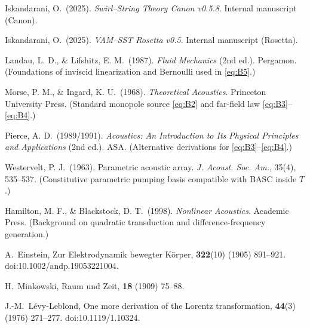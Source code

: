\documentclass[10pt,reprint,aps,onecolumn,nofootinbib]{revtex4-2}
\begin{document}
\begin{thebibliography}{99}
        Iskandarani, O.\ (2025).
        \emph{Swirl–String Theory Canon v0.5.8}.
        Internal manuscript (Canon).

        Iskandarani, O.\ (2025).
        \emph{VAM–SST Rosetta v0.5}.
        Internal manuscript (Rosetta).

        Landau, L. D., \& Lifshitz, E. M.\ (1987).
        \emph{Fluid Mechanics} (2nd ed.). Pergamon.
        (Foundations of inviscid linearization and Bernoulli used in \eqref{eq:B5}.)

        Morse, P. M., \& Ingard, K. U.\ (1968).
        \emph{Theoretical Acoustics}. Princeton University Press.
        (Standard monopole source \eqref{eq:B2} and far-field law \eqref{eq:B3}–\eqref{eq:B4}.)

        Pierce, A. D.\ (1989/1991).
        \emph{Acoustics: An Introduction to Its Physical Principles and Applications} (2nd ed.). ASA.
        (Alternative derivations for \eqref{eq:B3}–\eqref{eq:B4}.)

        Westervelt, P. J.\ (1963).
        Parametric acoustic array.
        \emph{J. Acoust. Soc. Am.}, 35(4), 535–537.
        (Constitutive parametric pumping basis compatible with BASC inside $T$.)

        Hamilton, M. F., \& Blackstock, D. T.\ (1998).
        \emph{Nonlinear Acoustics}. Academic Press.
        (Background on quadratic transduction and difference-frequency generation.)


        A.~Einstein,
        \newblock Zur Elektrodynamik bewegter K{\"o}rper,
         \textbf{322}(10) (1905) 891--921.
        \newblock doi:10.1002/andp.19053221004.

        H.~Minkowski,
        \newblock Raum und Zeit,
         \textbf{18} (1909) 75--88.

        J.-M.~L{\'e}vy-Leblond,
        \newblock One more derivation of the Lorentz transformation,
         \textbf{44}(3) (1976) 271--277.
        \newblock doi:10.1119/1.10324.



\end{thebibliography}
\end{document}
